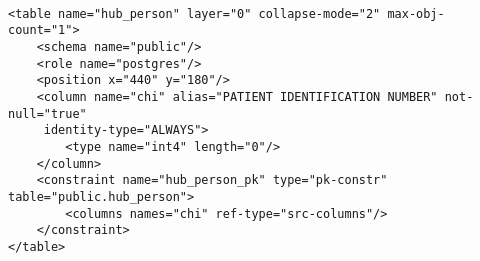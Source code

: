 \begin{lstlisting}

<table name="hub_person" layer="0" collapse-mode="2" max-obj-count="1">
	<schema name="public"/>
	<role name="postgres"/>
	<position x="440" y="180"/>
	<column name="chi" alias="PATIENT IDENTIFICATION NUMBER" not-null="true"
	 identity-type="ALWAYS">
		<type name="int4" length="0"/>
	</column>
	<constraint name="hub_person_pk" type="pk-constr" table="public.hub_person">
		<columns names="chi" ref-type="src-columns"/>
	</constraint>
</table>

\end{lstlisting}
